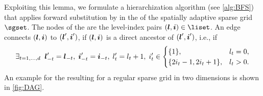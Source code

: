 Exploiting this lemma, we formulate
a hierarchization algorithm (see \cref{alg:BFS})
that applies forward substitution by \bfs in the \dagr of
the spatially adaptive sparse grid $\sgset$.
The nodes of the \dagr are the level-index pairs $(\*l, \*i) \in \liset$.
An edge connects $({\boldsymbol{l}}, {\boldsymbol{i}})$ to $({\boldsymbol{l}}', {\boldsymbol{i}}')$,
if $({\boldsymbol{l}}, {\boldsymbol{i}})$ is a direct ancestor of $({\boldsymbol{l}}', {\boldsymbol{i}}')$, i.e., if
{%
  \setlength{\abovedisplayskip}{9pt}%
  \setlength{\belowdisplayskip}{9pt}%
  \begin{equation}
    \label{eq:directAncestor}
    \exlarge{t = 1, \dotsc, d}{
      \*l'_{-t} = \*l_{-t},\;
      \*i'_{-t} = \*i_{-t},\;
      l'_t = l_t + 1,\;
      i'_t \in
      \begin{cases}
        \{1\},&l_t = 0,\\
        \{2i_t - 1, 2i_t + 1\},&l_t > 0.
      \end{cases}
    }
  \end{equation}%
}
An example for the resulting \dagr for a regular sparse grid
in two dimensions is shown in \cref{fig:DAG}.
%
